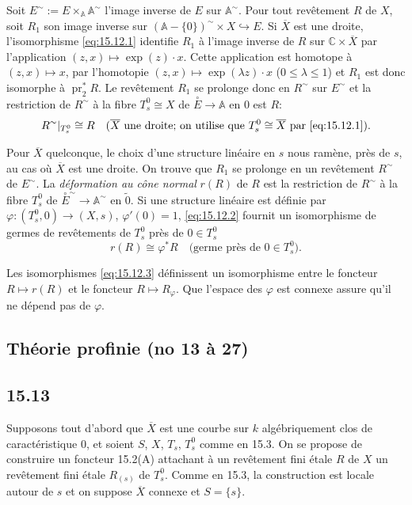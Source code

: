 \documentclass[12pt,a4paper]{article}
\theoremstyle{plain}
\theoremstyle{definition}
\theoremstyle{remark}
\DeclareMathOperator{\pr}{pr}
\newcommand{\bC}{\mathbb{C}}
\newcommand{\bA}{\mathbb{A}}
\begin{document}
Soit $E^\sim := E \times_{\bA} \bA^\sim$ l'image inverse de $E$ sur $\bA^\sim$. Pour tout revêtement $R$ de $X$, soit $R_1$ son image inverse sur $(\bA - \{0\})^\sim \times X \hookrightarrow E$. Si $\overline{X}$ est une droite, l'isomorphisme \eqref{eq:15.12.1} identifie $R_1$ à l'image inverse de $R$ sur $\bC \times \overline{X}$ par l'application $(z, x) \mapsto \exp(z) \cdot x$. Cette application est homotope à $(z, x) \mapsto x$, par l'homotopie $(z, x) \mapsto \exp(\lambda z) \cdot x$ ($0 \leqslant \lambda \leqslant 1$) et $R_1$ est donc isomorphe à $\pr_2^* R$. Le revêtement $R_1$ se prolonge donc en $R^\sim$ sur $E^\sim$ et la restriction de $R^\sim$ à la fibre $T_s^0 \cong X$ de $\overset{\circ}{E} \to \bA$ en $0$ est $R$:
\begin{equation}\label{eq:15.12.2}
R^\sim|_{T_s^0} \cong R \quad (\overline{X} \text{ une droite; on utilise que } T_s^0 \cong \overline{X} \text{ par } \eqref{eq:15.12.1}).
\end{equation}

Pour $\overline{X}$ quelconque, le choix d'une structure linéaire en $s$ nous ramène, près de $s$, au cas où $\overline{X}$ est une droite. On trouve que $R_1$ se prolonge en un revêtement $R^\sim$ de $E^\sim$. La \emph{déformation au cône normal} $r(R)$ de $R$ est la restriction de $R^\sim$ à la fibre $T_s^0$ de $\overset{\circ}{E}^\sim \to \bA^\sim$ en $\tilde{0}$. Si une structure linéaire est définie par $\varphi : (T_s^0, 0) \to (X, s)$, $\varphi'(0) = 1$, \eqref{eq:15.12.2} fournit un isomorphisme de germes de revêtements de $T_s^0$ près de $0 \in T_s^0$
\begin{equation}\label{eq:15.12.3}
r(R) \cong \varphi^* R \quad \text{(germe près de } 0 \in T_s^0\text{)}.
\end{equation}

Les isomorphismes \eqref{eq:15.12.3} définissent un isomorphisme entre le foncteur $R \mapsto r(R)$ et le foncteur $R \mapsto R_\varphi$. Que l'espace des $\varphi$ est connexe assure qu'il ne dépend pas de $\varphi$.


\subsection*{Théorie profinie (no 13 à 27)}

\subsection*{15.13}

Supposons tout d'abord que $\overline{X}$ est une courbe sur $k$ algébriquement clos de caractéristique $0$, et soient $S$, $X$, $T_s$, $T_s^0$ comme en 15.3. On se propose de construire un foncteur 15.2(A) attachant à un revêtement fini étale $R$ de $X$ un revêtement fini étale $R_{(s)}$ de $T_s^0$. Comme en 15.3, la construction est locale autour de $s$ et on suppose $\overline{X}$ connexe et $S = \{s\}$.
\end{document}
